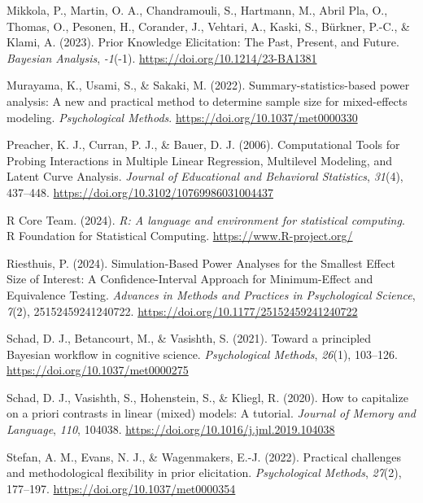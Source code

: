 \documentclass[
  man,
  floatsintext,
  longtable,
  a4paper,
  nolmodern,
  notxfonts,
  notimes,
  colorlinks=true,linkcolor=blue,citecolor=blue,urlcolor=blue]{apa7}
\newlength{\cslhangindent}
\newenvironment{CSLReferences}[2] %
 {\begin{list}{}{%
  \setlength{\itemindent}{0pt}
  \setlength{\leftmargin}{0pt}
  \setlength{\parsep}{0pt}
  \ifodd #1
   \setlength{\leftmargin}{\cslhangindent}
   \setlength{\itemindent}{-1\cslhangindent}
  \fi
  \setlength{\itemsep}{#2\baselineskip}}}
 {\end{list}}
\begin{document}
\begin{CSLReferences}{1}{0}
Mikkola, P., Martin, O. A., Chandramouli, S., Hartmann, M., Abril Pla,
O., Thomas, O., Pesonen, H., Corander, J., Vehtari, A., Kaski, S.,
Bürkner, P.-C., \& Klami, A. (2023). Prior {Knowledge Elicitation}: {The
Past}, {Present}, and {Future}. \emph{Bayesian Analysis}, \emph{-1}(-1).
\url{https://doi.org/10.1214/23-BA1381}

Murayama, K., Usami, S., \& Sakaki, M. (2022). Summary-statistics-based
power analysis: {A} new and practical method to determine sample size
for mixed-effects modeling. \emph{Psychological Methods}.
\url{https://doi.org/10.1037/met0000330}

Preacher, K. J., Curran, P. J., \& Bauer, D. J. (2006). Computational
{Tools} for {Probing Interactions} in {Multiple Linear Regression},
{Multilevel Modeling}, and {Latent Curve Analysis}. \emph{Journal of
Educational and Behavioral Statistics}, \emph{31}(4), 437--448.
\url{https://doi.org/10.3102/10769986031004437}

R Core Team. (2024). \emph{R: A language and environment for statistical
computing}. R Foundation for Statistical Computing.
\url{https://www.R-project.org/}

Riesthuis, P. (2024). Simulation-{Based Power Analyses} for the
{Smallest Effect Size} of {Interest}: {A Confidence-Interval Approach}
for {Minimum-Effect} and {Equivalence Testing}. \emph{Advances in
Methods and Practices in Psychological Science}, \emph{7}(2),
25152459241240722. \url{https://doi.org/10.1177/25152459241240722}

Schad, D. J., Betancourt, M., \& Vasishth, S. (2021). Toward a
principled {Bayesian} workflow in cognitive science. \emph{Psychological
Methods}, \emph{26}(1), 103--126.
\url{https://doi.org/10.1037/met0000275}

Schad, D. J., Vasishth, S., Hohenstein, S., \& Kliegl, R. (2020). How to
capitalize on a priori contrasts in linear (mixed) models: {A} tutorial.
\emph{Journal of Memory and Language}, \emph{110}, 104038.
\url{https://doi.org/10.1016/j.jml.2019.104038}

Stefan, A. M., Evans, N. J., \& Wagenmakers, E.-J. (2022). Practical
challenges and methodological flexibility in prior elicitation.
\emph{Psychological Methods}, \emph{27}(2), 177--197.
\url{https://doi.org/10.1037/met0000354}


\end{CSLReferences}
\end{document}
